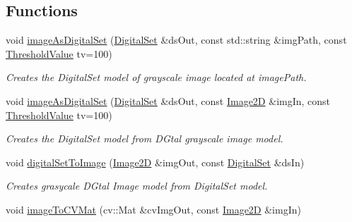 \subsection*{Functions}
\begin{DoxyCompactItemize}
\item 
void \mbox{\hyperlink{namespaceDIPaCUS_1_1Representation_a2b07e44f7c61b0a3b971cbda49aa0d88}{image\+As\+Digital\+Set}} (\mbox{\hyperlink{namespaceDIPaCUS_1_1Representation_a6eca0b4fa262f2d600f11d82ee10b5a6}{Digital\+Set}} \&ds\+Out, const std\+::string \&img\+Path, const \mbox{\hyperlink{namespaceDIPaCUS_1_1Representation_a85996f90f0c4186ddae15b4f372bf875}{Threshold\+Value}} tv=100)
\begin{DoxyCompactList}\small\item\em Creates the Digital\+Set model of grayscale image located at image\+Path. \end{DoxyCompactList}\item 
void \mbox{\hyperlink{namespaceDIPaCUS_1_1Representation_a7ec92a29e6c9a4b581c086f4be6185de}{image\+As\+Digital\+Set}} (\mbox{\hyperlink{namespaceDIPaCUS_1_1Representation_a6eca0b4fa262f2d600f11d82ee10b5a6}{Digital\+Set}} \&ds\+Out, const \mbox{\hyperlink{namespaceDIPaCUS_1_1Representation_ae97917e89f57298fda1626daad9f1733}{Image2D}} \&img\+In, const \mbox{\hyperlink{namespaceDIPaCUS_1_1Representation_a85996f90f0c4186ddae15b4f372bf875}{Threshold\+Value}} tv=100)
\begin{DoxyCompactList}\small\item\em Creates the Digital\+Set model from D\+Gtal grayscale image model. \end{DoxyCompactList}\item 
void \mbox{\hyperlink{namespaceDIPaCUS_1_1Representation_a41889947a0233ac7c4433140f2d8886a}{digital\+Set\+To\+Image}} (\mbox{\hyperlink{namespaceDIPaCUS_1_1Representation_ae97917e89f57298fda1626daad9f1733}{Image2D}} \&img\+Out, const \mbox{\hyperlink{namespaceDIPaCUS_1_1Representation_a6eca0b4fa262f2d600f11d82ee10b5a6}{Digital\+Set}} \&ds\+In)
\begin{DoxyCompactList}\small\item\em Creates grasycale D\+Gtal Image model from Digital\+Set model. \end{DoxyCompactList}\item 
void \mbox{\hyperlink{namespaceDIPaCUS_1_1Representation_a790f8a0a301e25de1fd7371e9b1ccada}{image\+To\+C\+V\+Mat}} (cv\+::\+Mat \&cv\+Img\+Out, const \mbox{\hyperlink{namespaceDIPaCUS_1_1Representation_ae97917e89f57298fda1626daad9f1733}{Image2D}} \&img\+In)

\end{DoxyCompactItemize}
